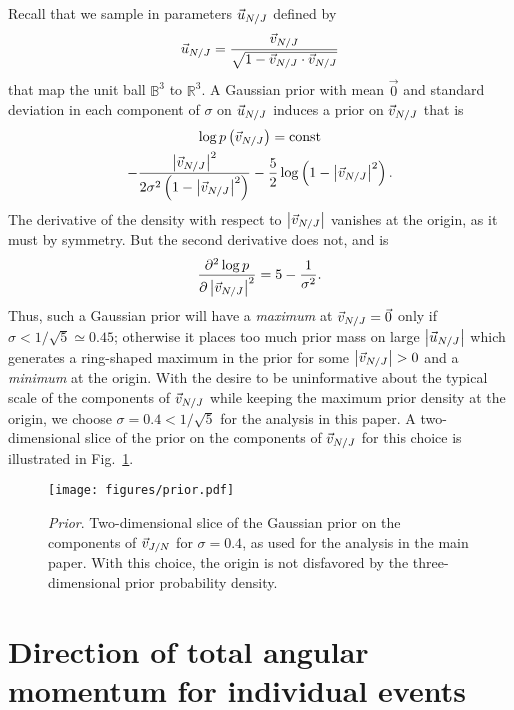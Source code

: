 \documentclass[aps,prd,twocolumn,superscriptaddress,preprintnumbers,floatfix,nofootinbib]{revtex4-2}
\begin{document}
Recall that we sample in parameters $\vec{u}_{N/J}$ defined by 
\begin{equation}
  \vec{u}_{N/J} = \frac{\vec{v}_{N/J}}{\sqrt{1 - \vec{v}_{N/J} \cdot \vec{v}_{N/J}}}
\end{equation}
that map the unit ball $\mathbb{B}^3$ to $\mathbb{R}^3$.  A Gaussian prior with
mean $\vec{0}$ and standard deviation in each component of $\sigma$ on
$\vec{u}_{N/J}$ induces a prior on $\vec{v}_{N/J}$ that is 
\begin{multline}
  \log p\left( \vec{v}_{N/J} \right) = \mathrm{const} \\ -\frac{\left| \vec{v}_{N/J} \right|^2}{2 \sigma^2 \left(1 - \left| \vec{v}_{N/J} \right|^2 \right)} - \frac{5}{2} \log \left( 1 - \left| \vec{v}_{N/J} \right|^2 \right).
\end{multline}
The derivative of the density with respect to $\left| \vec{v}_{N/J} \right|$
vanishes at the origin, as it must by symmetry.  But the second derivative does
not, and is 
\begin{equation}
  \frac{\partial^2 \log p}{\partial \left| \vec{v}_{N/J} \right|^2} = 5 - \frac{1}{\sigma^2}.
\end{equation}
Thus, such a Gaussian prior will have a \emph{maximum} at $\vec{v}_{N/J} = \vec{0}$
only if $\sigma < 1/\sqrt{5} \simeq 0.45$; otherwise it places too much prior
mass on large $\left|\vec{u}_{N/J}\right|$ which generates a ring-shaped maximum
in the prior for some $\left| \vec{v}_{N/J} \right| > 0$ and a \emph{minimum} at the
origin.  With the desire to be uninformative about the typical scale of the components of $\vec{v}_{N/J}$
while keeping the maximum prior density at the origin, we choose $\sigma = 0.4 <
1/\sqrt{5}$ for the analysis in this paper.
A two-dimensional slice of the prior on the components of $\vec{v}_{N/J}$ for this choice is illustrated in Fig.~\ref{fig:prior}.

\begin{figure}
\texttt{[image: figures/prior.pdf]}
\caption{\emph{Prior}. Two-dimensional slice of the Gaussian prior on the components of $\vec{v}_{J/N}$ for $\sigma = 0.4$, as used for the analysis in the main paper.
With this choice, the origin is not disfavored by the three-dimensional prior probability density.
}
\label{fig:prior}
\end{figure}

\section{Direction of total angular momentum for individual events}
\label{app:skymaps}
\end{document}
